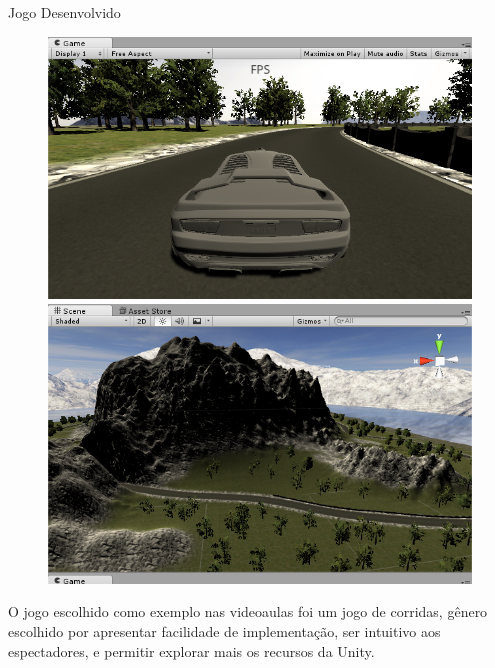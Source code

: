 \documentclass[10pt]{beamer}
\begin{document}
\begin{frame}{Jogo Desenvolvido}

\begin{figure}[H]
	\centering
	\begin{minipage}[b]{0.4\textwidth}
	\includegraphics[width=\textwidth]{figuras/game1.png}
	\end{minipage}
	\hfill
	\begin{minipage}[b]{0.4\textwidth}
		\includegraphics[width=\textwidth]{figuras/game2.png}
	\end{minipage}
\end{figure}

O jogo escolhido como exemplo nas videoaulas foi um jogo de corridas, gênero escolhido por apresentar facilidade de implementação, ser intuitivo aos espectadores,
e permitir explorar mais os recursos da Unity.

\end{frame}
\end{document}
